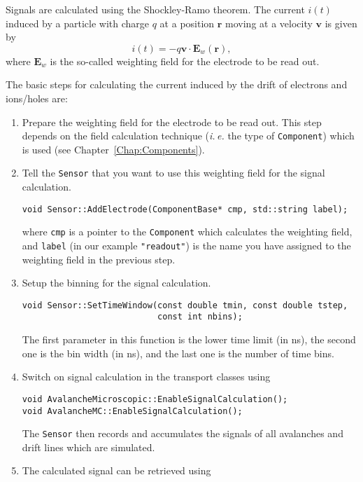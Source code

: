Signals are calculated using the Shockley-Ramo theorem. 
The current \(i\left(t\right)\) induced by a particle with charge 
\(q\) at a position \(\mathbf{r}\) moving at a velocity \(\mathbf{v}\)
is given by
\begin{equation*}
  i\left(t\right) = -q \mathbf{v} \cdot \mathbf{E}_{w}\left(\mathbf{r}\right),
\end{equation*}
where \(\mathbf{E}_{w}\) is the so-called weighting field for the 
electrode to be read out. 

The basic steps for calculating the current induced 
by the drift of electrons and ions/holes are:
\begin{enumerate}
  \item
  Prepare the weighting field for the electrode to be read out. 
  This step depends on the field calculation technique 
  (\textit{i.\,e.} the type of \texttt{Component}) which is used 
  (see Chapter~\ref{Chap:Components}). 
  \item
  Tell the \texttt{Sensor} that you want to use this 
  weighting field for the signal calculation. 
  \begin{lstlisting}
void Sensor::AddElectrode(ComponentBase* cmp, std::string label);
  \end{lstlisting}
  where \texttt{cmp} is a pointer to the \texttt{Component} 
  which calculates the weighting field, and \texttt{label} 
  (in our example \texttt{"readout"}) is 
  the name you have assigned to the weighting field in the previous step.
  \item
  Setup the binning for the signal calculation.
  \begin{lstlisting}
void Sensor::SetTimeWindow(const double tmin, const double tstep, 
                           const int nbins);
  \end{lstlisting}
  The first parameter in this function is the lower time limit (in ns), 
  the second one is the bin width (in ns), and the last one 
  is the number of time bins.
  \item
  Switch on signal calculation in the transport classes using 
  \begin{lstlisting}
void AvalancheMicroscopic::EnableSignalCalculation();
void AvalancheMC::EnableSignalCalculation();
  \end{lstlisting}
  The \texttt{Sensor} then records and accumulates the signals of all 
  avalanches and drift lines which are simulated.
  \item
  The calculated signal can be retrieved using 
  \begin{lstlisting}

\end{lstlisting}
\end{enumerate}
